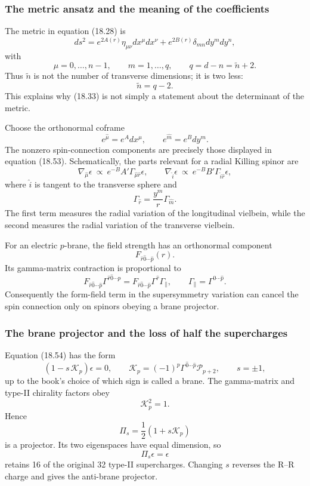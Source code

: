 \documentclass[
  10pt,
  a4paper,
  openany]{book}
\begin{document}
\subsubsection{The metric ansatz and the meaning of the
coefficients}\label{the-metric-ansatz-and-the-meaning-of-the-coefficients}

The metric in equation (18.28) is \[
ds^2
=e^{2A(r)}\eta_{\mu\nu}dx^\mu dx^\nu
+e^{2B(r)}\delta_{mn}dy^m dy^n,
\] with \[
\mu=0,\ldots,n-1,
\qquad
m=1,\ldots,q,
\qquad
q=d-n=\tilde n+2.
\] Thus \(\tilde n\) is not the number of transverse dimensions; it is
two less: \[
\tilde n=q-2.
\] This explains why (18.33) is not simply a statement about the
determinant of the metric.

Choose the orthonormal coframe \[
e^{\hat\mu}=e^A dx^\mu,
\qquad
e^{\hat m}=e^Bdy^m.
\] The nonzero spin-connection components are precisely those displayed
in equation (18.53). Schematically, the parts relevant for a radial
Killing spinor are \[
\nabla_{\hat\mu}\epsilon
\ \propto\ e^{-B}A'\Gamma_{\hat\mu\hat r}\epsilon,
\qquad
\nabla_{\hat i}\epsilon
\ \propto\ e^{-B}B'\Gamma_{\hat i\hat r}\epsilon,
\] where \(\hat i\) is tangent to the transverse sphere and \[
\Gamma_{\hat r}=\frac{y^m}{r}\Gamma_{\hat m}.
\] The first term measures the radial variation of the longitudinal
vielbein, while the second measures the radial variation of the
transverse vielbein.

For an electric \(p\)-brane, the field strength has an orthonormal
component \[
F_{\hat r\hat0\cdots\hat p}(r).
\] Its gamma-matrix contraction is proportional to \[
F_{\hat r\hat0\cdots\hat p}
\Gamma^{\hat r\hat0\cdots\hat p}
=F_{\hat r\hat0\cdots\hat p}
\Gamma^{\hat r}\Gamma_\parallel,
\qquad
\Gamma_\parallel=\Gamma^{\hat0\cdots\hat p}.
\] Consequently the form-field term in the supersymmetry variation can
cancel the spin connection only on spinors obeying a brane projector.

\subsubsection{The brane projector and the loss of half the
supercharges}\label{the-brane-projector-and-the-loss-of-half-the-supercharges}

Equation (18.54) has the form \[
\left(1-s\,\mathcal K_p\right)\epsilon=0,
\qquad
\mathcal K_p=(-1)^p\Gamma^{\hat0\cdots\hat p}\mathcal P_{p+2},
\qquad
s=\pm1,
\] up to the book's choice of which sign is called a brane. The
gamma-matrix and type-II chirality factors obey \[
\mathcal K_p^2=1.
\] Hence \[
\Pi_s=\frac12(1+s\mathcal K_p)
\] is a projector. Its two eigenspaces have equal dimension, so \[
\Pi_s\epsilon=\epsilon
\] retains 16 of the original 32 type-II supercharges. Changing \(s\)
reverses the R--R charge and gives the anti-brane projector.
\end{document}
